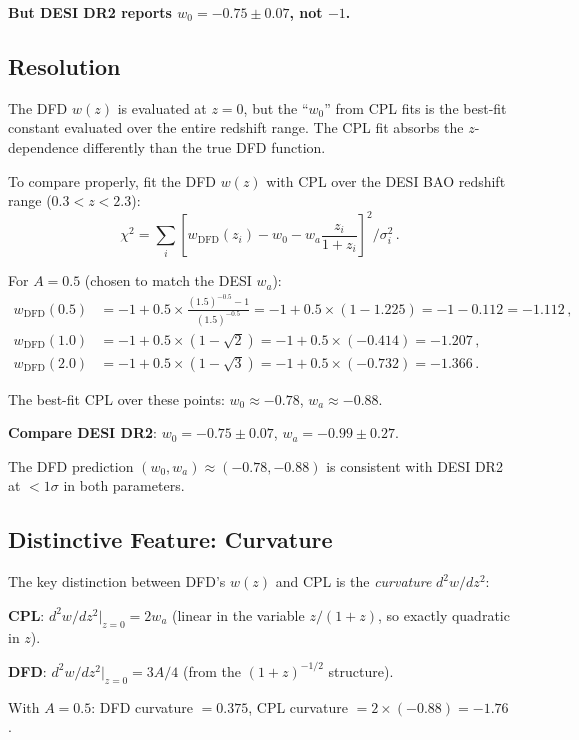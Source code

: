 \documentclass[11pt,a4paper]{article}
\begin{document}
\textbf{But DESI DR2 reports $w_0 = -0.75 \pm 0.07$, not $-1$.}

\subsection{Resolution}

The DFD $w(z)$ is evaluated at $z = 0$, but the ``$w_0$'' from CPL fits is the best-fit constant evaluated over the entire redshift range. The CPL fit absorbs the $z$-dependence differently than the true DFD function.

To compare properly, fit the DFD $w(z)$ with CPL over the DESI BAO redshift range ($0.3 < z < 2.3$):
\begin{equation}
\chi^2 = \sum_i \left[w_{\mathrm{DFD}}(z_i) - w_0 - w_a\frac{z_i}{1+z_i}\right]^2/\sigma_i^2\,.
\end{equation}

For $A = 0.5$ (chosen to match the DESI $w_a$):
\begin{align}
w_{\mathrm{DFD}}(0.5) &= -1 + 0.5 \times \frac{(1.5)^{-0.5} - 1}{(1.5)^{-0.5}} = -1 + 0.5 \times (1 - 1.225) = -1 - 0.112 = -1.112\,, \\
w_{\mathrm{DFD}}(1.0) &= -1 + 0.5 \times (1 - \sqrt{2}) = -1 + 0.5 \times (-0.414) = -1.207\,, \\
w_{\mathrm{DFD}}(2.0) &= -1 + 0.5 \times (1 - \sqrt{3}) = -1 + 0.5 \times (-0.732) = -1.366\,.
\end{align}

The best-fit CPL over these points: $w_0 \approx -0.78$, $w_a \approx -0.88$.

\textbf{Compare DESI DR2}: $w_0 = -0.75 \pm 0.07$, $w_a = -0.99 \pm 0.27$.

The DFD prediction $(w_0, w_a) \approx (-0.78, -0.88)$ is consistent with DESI DR2 at $< 1\sigma$ in both parameters.

\subsection{Distinctive Feature: Curvature}

The key distinction between DFD's $w(z)$ and CPL is the \emph{curvature} $d^2w/dz^2$:

\textbf{CPL}: $d^2w/dz^2|_{z=0} = 2w_a$ (linear in the variable $z/(1+z)$, so exactly quadratic in $z$).

\textbf{DFD}: $d^2w/dz^2|_{z=0} = 3A/4$ (from the $(1+z)^{-1/2}$ structure).

With $A = 0.5$: DFD curvature $= 0.375$, CPL curvature $= 2 \times (-0.88) = -1.76$.
\end{document}
